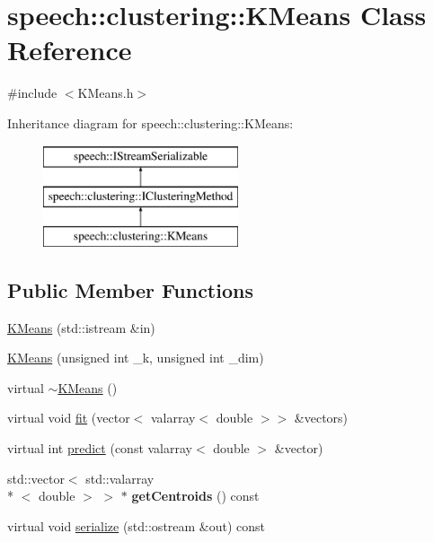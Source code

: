 \hypertarget{classspeech_1_1clustering_1_1KMeans}{\section{speech\+:\+:clustering\+:\+:K\+Means Class Reference}
\label{classspeech_1_1clustering_1_1KMeans}
}


{\ttfamily \#include $<$K\+Means.\+h$>$}

Inheritance diagram for speech\+:\+:clustering\+:\+:K\+Means\+:\begin{figure}[H]
\begin{center}
\leavevmode
\includegraphics[height=3.000000cm]{classspeech_1_1clustering_1_1KMeans}
\end{center}
\end{figure}
\subsection*{Public Member Functions}
\begin{DoxyCompactItemize}
\item 
\hyperlink{classspeech_1_1clustering_1_1KMeans_a24b819b6569e1b2228d4ff1b7a8dde40}{K\+Means} (std\+::istream \&in)
\item 
\hyperlink{classspeech_1_1clustering_1_1KMeans_a22d1f19adeed74ce6452aec02addd1ae}{K\+Means} (unsigned int \+\_\+k, unsigned int \+\_\+dim)
\item 
virtual \hyperlink{classspeech_1_1clustering_1_1KMeans_aaac97c4e9820cb0f3525b4a13a73ad30}{$\sim$\+K\+Means} ()
\item 
virtual void \hyperlink{classspeech_1_1clustering_1_1KMeans_a53a00478141ceee40366602a85e31ff4}{fit} (vector$<$ valarray$<$ double $>$$>$ \&vectors)
\item 
virtual int \hyperlink{classspeech_1_1clustering_1_1KMeans_a6b87bc8e097b0933220b7083ec846325}{predict} (const valarray$<$ double $>$ \&vector)
\item 
\hypertarget{classspeech_1_1clustering_1_1KMeans_a31e5171317f951f8138ff39b920b8807}{std\+::vector$<$ std\+::valarray\\*
$<$ double $>$ $>$ $\ast$ {\bfseries get\+Centroids} () const }\label{classspeech_1_1clustering_1_1KMeans_a31e5171317f951f8138ff39b920b8807}

\item 
virtual void \hyperlink{classspeech_1_1clustering_1_1KMeans_a47ba455f6996f45a1f61cde7e736e254}{serialize} (std\+::ostream \&out) const 
\end{DoxyCompactItemize}

